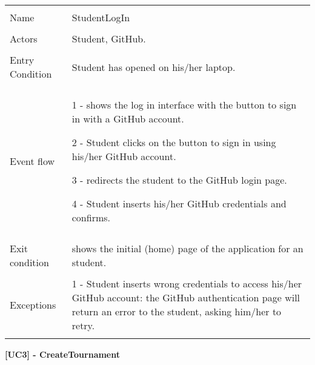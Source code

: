 	\begin{longtable}{p{3cm}p{14cm}}
		\hline\\
		Name & StudentLogIn \\
		\hline\\
		Actors & Student, GitHub. \\
		\hline\\
		Entry Condition & Student has opened \app on his/her laptop. \\
		\hline\\
		Event flow &  
		
		1 - \app shows the log in interface with the button to sign in with a GitHub account.
		
		2 - Student clicks on the button to sign in using his/her GitHub account.
		
		3 - \app redirects the student to the GitHub login page.
		
		4 - Student inserts his/her GitHub credentials and confirms.
		\\
		\hline\\
		Exit condition & \app shows the initial (home) page of the application for an student.  \\
		\hline\\
		Exceptions & 
		1 - Student inserts wrong credentials to access his/her GitHub account: the GitHub authentication page will return an error to the student, asking him/her to retry.\\
		\hline\\
      
    \end{longtable}
    
    \textbf{[UC3] - CreateTournament}
    
